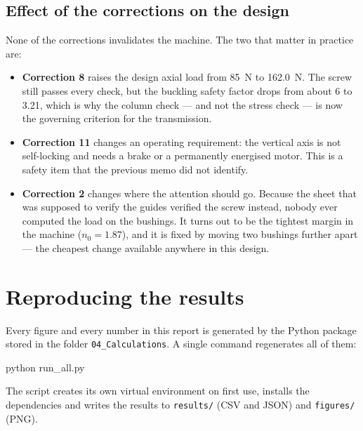 \documentclass[11pt]{article}
\def\calculo{ }
\def\nombre{Group 2}
\newcommand{\sheet}[2]{\clearpage\def\calculo{#1}\def\nombre{#2}}
\begin{document}
\subsection{Effect of the corrections on the design}

None of the corrections invalidates the machine. The two that matter in practice are:

\begin{itemize}[leftmargin=*,nosep]
  \item \textbf{Correction 8} raises the design axial load from \SI{85}{\newton} to
        \SI{162.0}{\newton}. The screw still passes every check, but the buckling safety
        factor drops from about 6 to 3.21, which is why the column check --- and not the
        stress check --- is now the governing criterion for the transmission.
  \item \textbf{Correction 11} changes an operating requirement: the vertical axis is not
        self-locking and needs a brake or a permanently energised motor. This is a safety
        item that the previous memo did not identify.
  \item \textbf{Correction 2} changes where the attention should go. Because the sheet
        that was supposed to verify the guides verified the screw instead, nobody ever
        computed the load on the bushings. It turns out to be the tightest margin in the
        machine ($n_0=1.87$), and it is fixed by moving two bushings further apart --- the
        cheapest change available anywhere in this design.
\end{itemize}

\sheet{Appendix B -- Calculation software}{Group 2}
\section{Reproducing the results}\label{sec:software}

Every figure and every number in this report is generated by the Python package stored
in the folder \texttt{04\_Calculations}. A single command regenerates all of them:

\begin{center}\ttfamily
python run\_all.py
\end{center}

The script creates its own virtual environment on first use, installs the dependencies and
writes the results to \texttt{results/} (CSV and JSON) and \texttt{figures/} (PNG).
\end{document}
